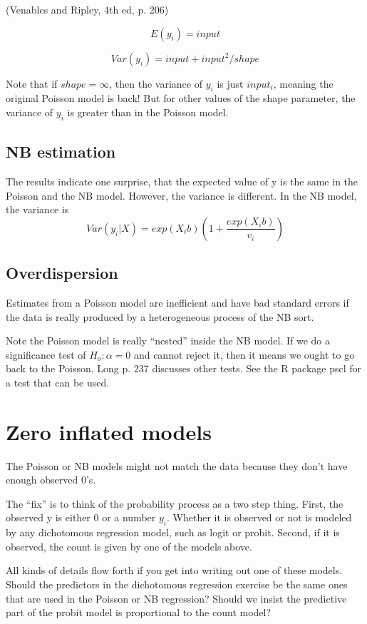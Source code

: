\documentclass[10pt,english]{beamer}
\def\lyxframeend{} %
\begin{document}
(Venables and Ripley, 4th ed, p. 206)

\[
E(y_{i})=input
\]


\[
Var(y_{i})=input+input^{2}/shape
\]


Note that if $shape=\infty$, then the variance of $y_{i}$ is just
$input_{i}$, meaning the original Poisson model is back! But for
other values of the shape parameter, the variance of $y_{i}$ is greater
than in the Poisson model.


\lyxframeend{}\subsection{NB estimation}

The results indicate one surprise, that the expected value of y is
the same in the Poisson and the NB model. However, the variance is
different. In the NB model, the variance is
\[
Var(y_{i}|X)=exp(X_{i}b)\left(1+\frac{exp(X_{i}b)}{v_{i}}\right)
\]



\lyxframeend{}\subsection{Overdispersion}

Estimates from a Poisson model are inefficient and have bad standard
errors if the data is really produced by a heterogeneous process of
the NB sort.

Note the Poisson model is really ``nested'' inside the NB model.
If we do a significance test of $H_{o}:\alpha=0$ and cannot reject
it, then it means we ought to go back to the Poisson. Long p. 237
discusses other tests. See the R package pscl for a test that can
be used.


\lyxframeend{}\section{Zero inflated models}

The Poisson or NB models might not match the data because they don't
have enough observed 0's.

The ``fix'' is to think of the probability process as a two step
thing. First, the observed y is either 0 or a number $y_{i}.$ Whether
it is observed or not is modeled by any dichotomous regression model,
such as logit or probit. Second, if it is observed, the count is given
by one of the models above.

All kinds of details flow forth if you get into writing out one of
these models. Should the predictors in the dichotomous regression
exercise be the same ones that are used in the Poisson or NB regression?
Should we insist the predictive part of the probit model is proportional
to the count model?
\end{document}
